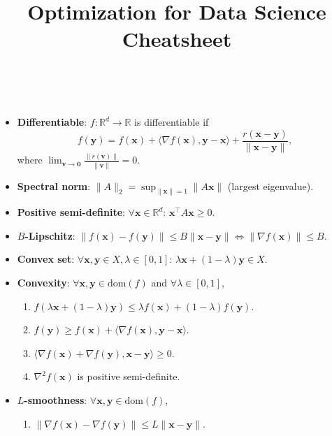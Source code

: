\documentclass[8pt,a4paper]{extarticle}
\title{Optimization for Data Science Cheatsheet}
\newcommand{\R}{\mathbb{R}}
\renewcommand{\vec}[1]{\bm{#1}}
\newcommand{\mat}[1]{#1}
\newcommand{\dom}[1]{\mathrm{dom}(#1)}
\newenvironment{topic}[1]
{\textbf{\sffamily \colorbox{black}{\rlap{\textbf{\textcolor{white}{#1}}}\hspace{\linewidth}\hspace{-2\fboxsep}}} \\ \vspace{0.2cm}}
{}
\begin{document}
\setlength{\columnsep}{0.2cm}

\begin{multicols*}{2}
    \begin{topic}{Definitions}
        \begin{itemize}
            \item \textbf{Differentiable}: $f: \R^d \to \R$ is differentiable if \[
                      f(\vec{y}) = f(\vec{x}) + \langle \nabla f(\vec{x}), \vec{y} - \vec{x} \rangle + \frac{r(\vec{x} - \vec{y})}{\| \vec{x} - \vec{y} \|},
                  \]
                  where $\lim_{\vec{v} \to \vec{0}} \frac{\| r(\vec{v}) \|}{\| \vec{v} \|} = 0$.

            \item \textbf{Spectral norm}: $\| \mat{A} \|_2 = \sup_{\| \vec{x} \| = 1} \| \mat{A} \vec{x} \|$ (largest eigenvalue).
            \item \textbf{Positive semi-definite}: $\forall \vec{x} \in \R^d$: $\vec{x}^\top \mat{A} \vec{x} \geq 0$.
            \item \textbf{$B$-Lipschitz}: $\| f(\vec{x}) - f(\vec{y}) \| \leq B \| \vec{x} - \vec{y} \| \Leftrightarrow \| \nabla f(\vec{x}) \| \leq B$.
            \item \textbf{Convex set}: $\forall \vec{x}, \vec{y} \in X, \lambda \in [0,1]$: $\lambda \vec{x} + (1-\lambda) \vec{y} \in X$.
            \item \textbf{Convexity}: $\forall \vec{x}, \vec{y} \in \dom{f}$ and $\forall \lambda \in [0,1]$,
                  \begin{enumerate}
                      \item $f(\lambda \vec{x} + (1-\lambda)\vec{y}) \leq \lambda f(\vec{x}) + (1-\lambda) f(\vec{y})$.
                      \item $f(\vec{y}) \geq f(\vec{x}) + \langle \nabla f(\vec{x}), \vec{y} - \vec{x} \rangle$.
                      \item $\langle \nabla f(\vec{x}) + \nabla f(\vec{y}), \vec{x} - \vec{y} \rangle \geq 0$.
                      \item $\nabla^2 f(\vec{x})$ is positive semi-definite.
                  \end{enumerate}
            \item \textbf{$L$-smoothness}: $\forall \vec{x}, \vec{y} \in \dom{f}$,
                  \begin{enumerate}
                      \item $\| \nabla f(\vec{x}) - \nabla f(\vec{y}) \| \leq L \| \vec{x} - \vec{y} \|$.

\end{enumerate}
\end{itemize}
\end{topic}
\end{multicols*}
\end{document}
